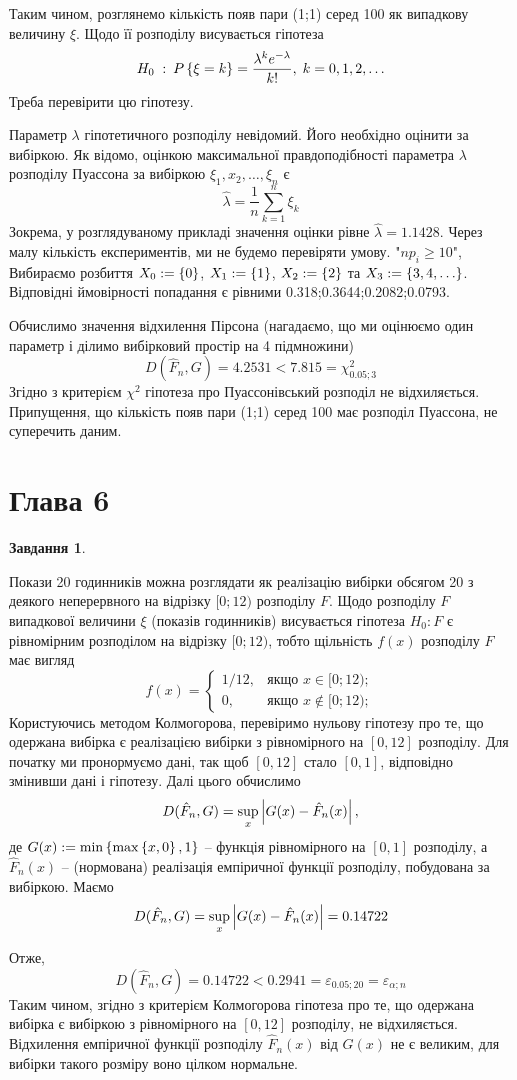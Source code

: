 \documentclass[12pt]{article} %
\newtheorem{prob}{Завдання}
\begin{document}
	Таким чином, розглянемо кількість появ пари (1;1) серед 100 як випадкову величину $\xi$. Щодо її розподілу висувається гіпотеза
	\[H_0\;:\:P\left\{\xi=k\right\}=\frac{\lambda^ke^{-\lambda}}{k!},\;k=0,1,2,\hdots\]
	Треба перевірити цю гіпотезу.

	Параметр $\lambda$ гіпотетичного розподілу невідомий. Його необхідно оцінити за вибіркою. Як відомо, оцінкою максимальної правдоподібності
	параметра $\lambda$ розподілу Пуассона за вибіркою $\xi_1,x_2,\hdots,\xi_n$ є
	\[\hat{\lambda}=\frac{1}{n}\sum_{k=1}^n\xi_k\]
	Зокрема, у розглядуваному прикладі значення оцінки рівне $\hat{\lambda}=1.1428$. Через малу кількість експериментів, ми не будемо
	перевіряти умову. "$np_i\geq10$",
	Вибираємо розбиття $X_0:=\left\{0\right\}$, $X_1:=\left\{1\right\}$, $X_2:=\left\{2\right\}$ та
	$X_3:=\left\{3,4,\hdots\right\}$.
	Відповідні ймовірності попадання є рівними 0.318;0.3644;0.2082;0.0793.

	Обчислимо значення відхилення Пірсона (нагадаємо, що ми оцінюємо один параметр і ділимо вибірковий простір на 4 підмножини)
	\[D(\hat{F}_n,G)=4.2531<7.815=\chi^2_{0.05;3}\]
	Згідно з критерієм $\chi^2$ гіпотеза про Пуассонівський розподіл не відхиляється. Припущення,
	що кількість появ пари (1;1) серед 100 має розподіл Пуассона, не суперечить даним.
\section{Глава 6}
\setcounter{prob}{15}
\begin{prob}\end{prob}
	Покази 20 годинників можна розглядати як реалізацію вибірки обсягом 20 з деякого неперервного на відрізку $[0;12)$ розподілу $F$. Щодо
	розподілу $F$ випадкової величини $\xi$ (показів годинників) висувається гіпотеза $H_0:F$ є рівномірним розподілом на відрізку $[0;12)$,
	тобто щільність $f(x)$ розподілу $F$ має вигляд
	\[f(x)=\left\{\begin{array}{cr}1/12,&\mbox{якщо }x\in[0;12);\\0,&\mbox{якщо }x\notin[0;12);\end{array}\right.\]
	Користуючись методом
	Колмогорова, перевіримо нульову гіпотезу про те, що одержана вибірка є реалізацією вибірки з рівномірного на $[0,12]$ розподілу. Для початку
	ми пронормуємо дані, так щоб $[0,12]$ стало $[0,1]$, відповідно змінивши дані і гіпотезу.
	Далі цього обчислимо
	\[D(\hat{F}_n,G)=\sup_x\myabs{G(x)-\hat{F}_n(x)},\]
	де $G(x):=\min\mycbra{\max\mycbra{x,0},1}$ -- функція рівномірного на $[0,1]$ розподілу, а $\hat{F}_n(x)$ -- (нормована) 
	реалізація емпіричної функції розподілу, побудована за вибіркою. Маємо
	\[D(\hat{F}_n,G)=\sup_x\myabs{G(x)-\hat{F}_n(x)}=0.14722\]

	Отже,
	\[D(\hat{F}_n,G)=0.14722<0.2941=\varepsilon_{0.05;20}=\varepsilon_{\alpha;n}\]
	Таким чином, згідно з критерієм Колмогорова гіпотеза про те, що одержана вибірка є вибіркою з рівномірного на $[0,12]$ розподілу,
	не відхиляється. Відхилення емпіричної функції розподілу $\hat{F}_n(x)$ від $G(x)$ не є великим, для вибірки такого розміру воно
	цілком нормальне.
\end{document}
